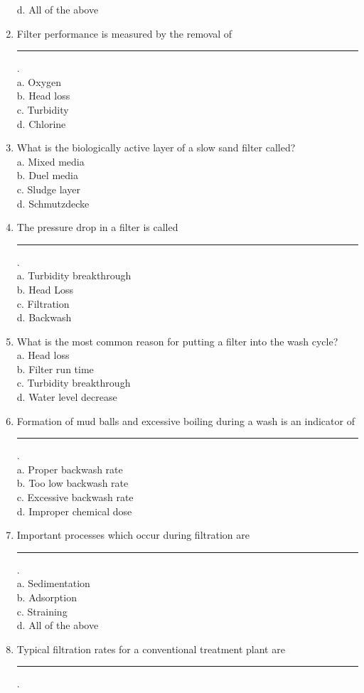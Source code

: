 \begin{enumerate}
d.	All of the above\\
\item Filter performance is measured by the removal of \rule{1.5cm}{0.5pt}.\\
a.	Oxygen\\
b.	Head loss\\
c.	Turbidity\\
d.	Chlorine\\
\item What is the biologically active layer of a slow sand filter called?\\
a.	Mixed media\\
b.	Duel media\\
c.	Sludge layer\\
d.	Schmutzdecke\\
\item The pressure drop in a filter is called \rule{1.5cm}{0.5pt}.\\
a.	Turbidity breakthrough\\
b.	Head Loss\\
c.	Filtration\\
d.	Backwash\\
\item What is the most common reason for putting a filter into the wash cycle?\\
a.	Head loss\\
b.	Filter run time\\
c.	Turbidity breakthrough\\
d.	Water level decrease\\
\item Formation of mud balls and excessive boiling during a wash is an indicator of \rule{1.5cm}{0.5pt}.\\
a.	Proper backwash rate\\
b.	Too low backwash rate\\
c.	Excessive backwash rate\\
d.	Improper chemical dose\\
\item Important processes which occur during filtration are \rule{1.5cm}{0.5pt}.\\
a.	Sedimentation\\
b.	Adsorption\\
c.	Straining\\
d.	All of the above\\
\item Typical filtration rates for a conventional treatment plant are \rule{1.5cm}{0.5pt}.\\

\end{enumerate}
